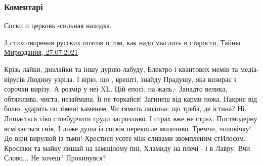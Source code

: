  
 
 
 
 
\subsubsection{Коментарі}
\label{sec:27_07_2021.fb.bilchenko_evgenia.1.kreschenie_xxi.cmt}

\begin{itemize}
 
Соски и церковь -сильная находка.

 

\href{http://www.tayni-mirozdaniya.ru/2021/07/3_23.html}{%
3 стихотворения русских поэтов о том, как надо мыслить в старости, Тайны Мироздания, 27.07.2021%
}

 

\obeycr
Крізь лайки, дизлайки та іншу дурню-лабуду,
Електро і квантових мемів та медіа-вірусів
Людину узріла. І вірю, що , врешті, знайду
Прадушу, яка визирає з сорочки вирізу.
\smallskip
А розмір у неї XL. Цій епосі, на жаль,-
Занадто велика, обтяжлива, чиста, незаймана.
Її не торкайся! Загинеш від карми ножа,
Накриє від болю, ударить по тімені каменем.
\smallskip
Чи тямить людина: що треба, де істина? Ні.
Лишається тіко стовбурчити груди загрозливо.
І страх вже не страх. Постмодерну всміхається гнів,
І лиже душа із сосків перекисле молозиво.
\smallskip
Тремчи, чоловічку! До віри вирулюй із тьми!
Хрестися усоте між сливами звомпленим стИлосом.
Кросівки та майку лишай на замшілому пні,
Хламиду на плечі - і в Лавру. Вчи Слово... 
\smallskip
Не хочеш? Прокинувся?
\restorecr


\end{itemize}
